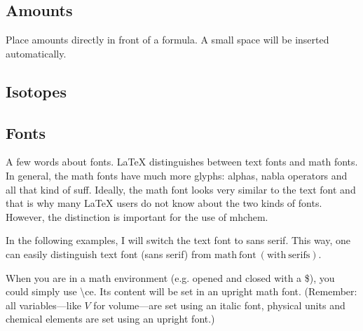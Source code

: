 \documentclass[a4paper,notitlepage]{scrreprt}
\newcommand\macro[1]{{\ttfamily\textbackslash#1}}
\newcommand\fromversion[1]{\marginpar{{\scriptsize version$\geq$#1}}}
\begin{document}
\subsection{Amounts} 

Place amounts directly in front of a formula. A small space will be inserted
automatically.

\medskip
\begin{SideBySideExample}[xrightmargin=2cm]
\end{SideBySideExample}

\medskip
\begin{SideBySideExample}[xrightmargin=2cm]
\end{SideBySideExample}
\fromversion{3.13}

\medskip
\begin{SideBySideExample}[xrightmargin=2cm]
\end{SideBySideExample}


\subsection{Isotopes}

\begin{SideBySideExample}[xrightmargin=2cm]
\end{SideBySideExample}


\subsection{Fonts}

A few words about fonts. LaTeX distinguishes between text fonts and math fonts. In general, the math fonts have much more glyphs: alphas, nabla operators and all that kind of suff. Ideally, the math font looks very similar to the text font and that is why many LaTeX users do not know about the two kinds of fonts. However, the distinction is important for the use of mhchem.

\medskip

\noindent
In the following examples, I will switch the text font to sans serif. This way, one can easily distinguish \textsf{text font (sans serif)} from $\mathrm{math\ font\ (with\ serifs)}$.

\medskip 

\noindent
When you are in a math environment (e.g. opened and closed with a \$), you could simply use \macro{ce}. Its content will be set in an upright math font. (Remember: all variables---like $V$ for volume---are set using an italic font, physical units and chemical elements are set using an upright font.)
\end{document}
